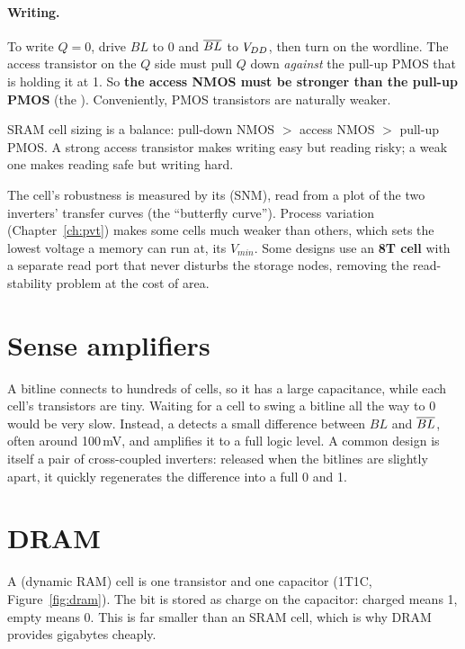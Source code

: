 \paragraph{Writing.} To write $Q = 0$, drive $BL$ to 0 and $\overline{BL}$ to $V_{DD}$, then turn on the wordline. The access transistor on the $Q$ side must pull $Q$ down \emph{against} the pull-up PMOS that is holding it at 1. So \textbf{the access NMOS must be stronger than the pull-up PMOS} (the ). Conveniently, PMOS transistors are naturally weaker.

\begin{bigidea}
SRAM cell sizing is a balance: pull-down NMOS $>$ access NMOS $>$ pull-up PMOS. A strong access transistor makes writing easy but reading risky; a weak one makes reading safe but writing hard.
\end{bigidea}

The cell's robustness is measured by its  (SNM), read from a plot of the two inverters' transfer curves (the ``butterfly curve''). Process variation (Chapter~\ref{ch:pvt}) makes some cells much weaker than others, which sets the lowest voltage a memory can run at, its $V_{min}$. Some designs use an \textbf{8T cell} with a separate read port that never disturbs the storage nodes, removing the read-stability problem at the cost of area.

\section{Sense amplifiers}

A bitline connects to hundreds of cells, so it has a large capacitance, while each cell's transistors are tiny. Waiting for a cell to swing a bitline all the way to 0 would be very slow. Instead, a  detects a small difference between $BL$ and $\overline{BL}$, often around 100\,mV, and amplifies it to a full logic level. A common design is itself a pair of cross-coupled inverters: released when the bitlines are slightly apart, it quickly regenerates the difference into a full 0 and 1.

\section{DRAM}

A  (dynamic RAM) cell is one transistor and one capacitor (1T1C, Figure~\ref{fig:dram}). The bit is stored as charge on the capacitor: charged means 1, empty means 0. This is far smaller than an SRAM cell, which is why DRAM provides gigabytes cheaply.

